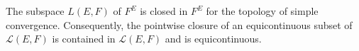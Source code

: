 The subspace $L(E, F)$ of $F^E$ is closed in $F^E$ for the topology of simple convergence. Consequently, the pointwise closure of an equicontinuous subset of $\mathcal{L}(E, F)$ is contained in $\mathcal{L}(E, F)$ and is equicontinuous.
